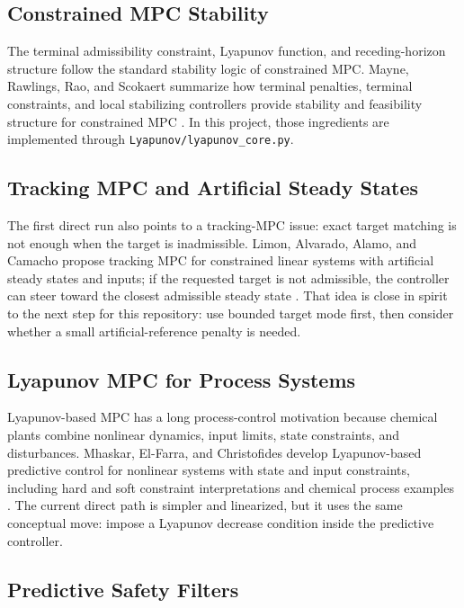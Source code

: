 \documentclass[11pt]{article}
\begin{document}
\subsection{Constrained MPC Stability}

The terminal admissibility constraint, Lyapunov function, and receding-horizon
structure follow the standard stability logic of constrained MPC. Mayne,
Rawlings, Rao, and Scokaert summarize how terminal penalties, terminal
constraints, and local stabilizing controllers provide stability and feasibility
structure for constrained MPC
\cite{mayne2000}. In this project, those ingredients are implemented through
\texttt{Lyapunov/lyapunov\_core.py}.

\subsection{Tracking MPC and Artificial Steady States}

The first direct run also points to a tracking-MPC issue: exact target matching
is not enough when the target is inadmissible. Limon, Alvarado, Alamo, and
Camacho propose tracking MPC for constrained linear systems with artificial
steady states and inputs; if the requested target is not admissible, the
controller can steer toward the closest admissible steady state \cite{limon2008}.
That idea is close in spirit to the next step for this repository: use bounded
target mode first, then consider whether a small artificial-reference penalty is
needed.

\subsection{Lyapunov MPC for Process Systems}

Lyapunov-based MPC has a long process-control motivation because chemical
plants combine nonlinear dynamics, input limits, state constraints, and
disturbances. Mhaskar, El-Farra, and Christofides develop Lyapunov-based
predictive control for nonlinear systems with state and input constraints,
including hard and soft constraint interpretations and chemical process examples
\cite{mhaskar2006}. The current direct path is simpler and linearized, but it
uses the same conceptual move: impose a Lyapunov decrease condition inside the
predictive controller.

\subsection{Predictive Safety Filters}
\end{document}
